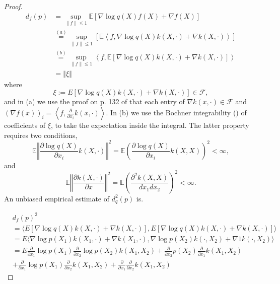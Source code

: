 \documentclass{article}
\begin{document}
\begin{proof}
 \begin{align*}
d_{f}(p) & =\sup_{\|f\|\le1}\mathbb{E} \left[\nabla \log q(X)f(X)+\nabla f(X)\right]\\
 & \overset{(a)}{=}\sup_{\|f\|\le1}\left[\mathbb{E} \left\langle f, \nabla \log q(X) k(X,\cdot)+\nabla k(X,\cdot)\right\rangle \right]\\
 & \overset{(b)}{=}\sup_{\|f\|\le1}\left\langle f,\mathbb{E} \left[ \nabla \log q(X) k(X,\cdot)+\nabla k(X,\cdot)\right]\right\rangle \\
 & =\left\Vert \xi\right\Vert 
\end{align*}
where
\[
\xi:=E \left[\nabla \log q(X) k(X,\cdot)+\nabla k(X,\cdot)\right] \in\mathcal{F},
\]
and in (a) we use the proof on p. 132 of \cite[Corollary 4.36]{SteChr08}
that each entry of $\nabla k(x,\cdot)\in\mathcal{F}$ and $\left(\nabla f(x)\right)_{i}=\left\langle f,\frac{\partial}{\partial x_{i}}k(x,\cdot)\right\rangle $.
In (b) we use the Bochner integrability (\cite[Definition A.5.20]{SteChr08}) of coefficients of $\xi$, to take the expectation inside the integral. The latter property requires
two conditions,
\[
\mathbb{E} \left\Vert \frac{\partial \log q(X) }{\partial x_i} k(X,\cdot)\right\Vert^2 = \mathbb{E} \left( \frac{\partial \log q(X) }{\partial x_i} k(X,X) \right)^2 <\infty,
\]
and
\[
\mathbb{E} \left\Vert \frac{\partial k(X,\cdot)}{\partial x}\right\Vert^2 =\mathbb{E} \left(\frac{\partial^{2} k(X,X) }{dx_1 dx_2}\right)^2<\infty.
\]
An unbiased empirical estimate of $d_{q}^{2}(p)$ is.

\begin{align*}
&d_f(p)^2  \\
& = \langle E \left[\nabla \log q(X) k(X,\cdot)+\nabla k(X,\cdot)\right] ,E \left[\nabla \log q(X) k(X,\cdot)+\nabla k(X,\cdot)\right] \rangle \\
&= E \langle   \nabla \log p(X_1) k(X_1,\cdot) + \nabla k(X_1,\cdot) , \nabla \log p(X_2) k(\cdot,X_2) + \nabla1 k(\cdot,X_2) \rangle \\
  &= E  \frac{\partial } {\partial x_1} \log p(X_1) \frac{\partial } {\partial x_2} \log p(X_2) k(X_1,X_2) +
          \frac{\partial } {\partial x_2} p(X_2) \frac{\partial } {\partial x_1} k(X_1,X_2) \\
  &+  \frac{\partial } {\partial x_1} \log p(X_1) \frac{\partial } {\partial x_2} k(X_1,X_2) + \frac{\partial } {\partial x_1}\frac{\partial } {\partial x_2} k(X_1,X_2)
\end{align*}
\end{proof}
\end{document}
